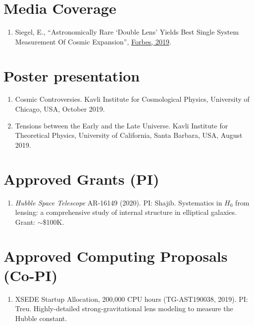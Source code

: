 \documentclass[margin, line]{res}
\begin{document}
\begin{resume}
\section{\sc Media Coverage}
\begin{enumerate}
	\item Siegel, E., ``Astronomically Rare `Double Lens' Yields Best Single System Measurement Of Cosmic Expansion'', \href{https://www.forbes.com/sites/startswithabang/2019/10/28/astronomically-rare-double-lens-yields-best-single-system-measurement-of-cosmic-expansion/#55acbc504373}{Forbes, 2019}.	
\end{enumerate}


\section{\sc Poster presentation}
\begin{enumerate}
	\item Cosmic Controversies. Kavli Institute for Cosmological Physics, University of Chicago, USA, October 2019.
	\item Tensions between the Early and the Late Universe. Kavli Institute for Theoretical Physics, University of California, Santa Barbara, USA, August 2019.
\end{enumerate}

\section{\sc Approved Grants (PI)}
\begin{enumerate}
	\item \textit{Hubble Space Telescope} AR-16149 (2020). PI: Shajib. Systematics in $H_0$ from lensing: a comprehensive study of internal structure in elliptical galaxies. Grant: $\sim$\$100K.
\end{enumerate}

\section{\sc Approved Computing Proposals (Co-PI)}
\begin{enumerate}
\item XSEDE Startup Allocation, 200,000 CPU hours (TG-AST190038, 2019). PI: Treu. Highly-detailed strong-gravitational lens modeling to measure the Hubble constant.   
\end{enumerate}


\end{resume}
\end{document}
